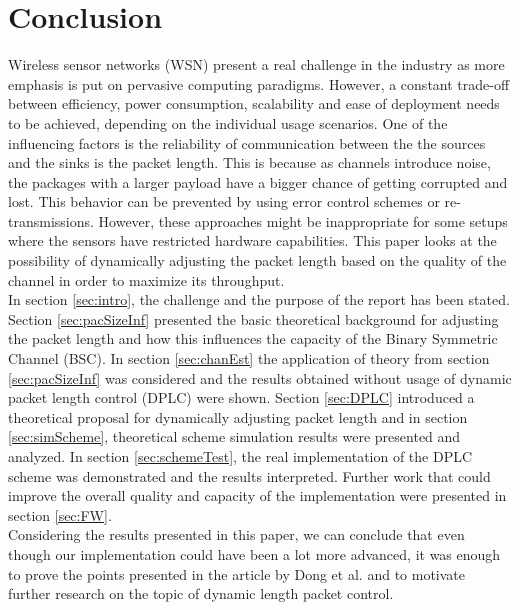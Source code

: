 \section{Conclusion\label{sec:conclusion}}
Wireless sensor networks (WSN) present a real challenge in the industry as more emphasis is put on pervasive computing paradigms. However, a constant trade-off between efficiency, power consumption, scalability and ease of deployment needs to be achieved, depending on the individual usage scenarios. One of the influencing factors is the reliability of communication between the the sources and the sinks is the packet length. This is because as channels introduce noise, the packages with a larger payload have a bigger chance of getting corrupted and lost. This behavior can be prevented by using error control schemes or re-transmissions. However, these approaches might be inappropriate for some setups where the sensors have restricted hardware capabilities. This paper looks at the possibility of dynamically adjusting the packet length based on the quality of the channel in order to maximize its throughput.
\\[8pt]
In section \ref{sec:intro}, the challenge and the purpose of the report has been stated. Section \ref{sec:pacSizeInf} presented the basic theoretical background for adjusting the packet length and how this influences the capacity of the Binary Symmetric Channel (BSC). In section \ref{sec:chanEst} the application of theory from section \ref{sec:pacSizeInf} was considered and the results obtained without usage of dynamic packet length control (DPLC) were shown. Section \ref{sec:DPLC} introduced a theoretical proposal for dynamically adjusting packet length and in section \ref{sec:simScheme}, theoretical scheme simulation results were presented and analyzed. In section \ref{sec:schemeTest}, the real implementation of the DPLC scheme was demonstrated and the results interpreted. Further work that could improve the overall quality and capacity of the implementation were presented in section \ref{sec:FW}.
\\[8pt]
Considering the results presented in this paper, we can conclude that even though our implementation could have been a lot more advanced, it was enough to prove the points presented in the article by Dong et al. \cite{DPLCpaper} and to motivate further research on the topic of dynamic length packet control. 
